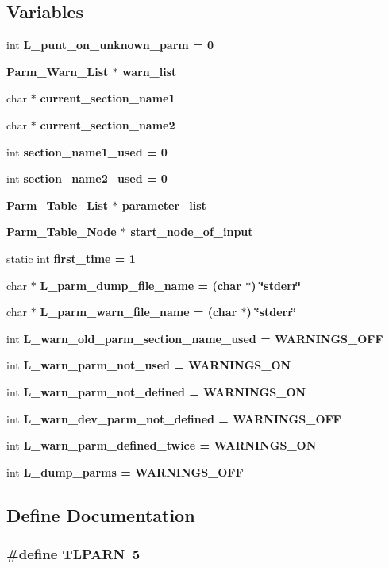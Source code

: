\subsection*{Variables}
\begin{CompactItemize}
\item 
int \bf{L\_\-punt\_\-on\_\-unknown\_\-parm} = 0
\item 
\bf{Parm\_\-Warn\_\-List} $\ast$ \bf{warn\_\-list}
\item 
char $\ast$ \bf{current\_\-section\_\-name1}
\item 
char $\ast$ \bf{current\_\-section\_\-name2}
\item 
int \bf{section\_\-name1\_\-used} = 0
\item 
int \bf{section\_\-name2\_\-used} = 0
\item 
\bf{Parm\_\-Table\_\-List} $\ast$ \bf{parameter\_\-list}
\item 
\bf{Parm\_\-Table\_\-Node} $\ast$ \bf{start\_\-node\_\-of\_\-input}
\item 
static int \bf{first\_\-time} = 1
\item 
char $\ast$ \bf{L\_\-parm\_\-dump\_\-file\_\-name} = (char $\ast$) \char`\"{}stderr\char`\"{}
\item 
char $\ast$ \bf{L\_\-parm\_\-warn\_\-file\_\-name} = (char $\ast$) \char`\"{}stderr\char`\"{}
\item 
int \bf{L\_\-warn\_\-old\_\-parm\_\-section\_\-name\_\-used} = WARNINGS\_\-OFF
\item 
int \bf{L\_\-warn\_\-parm\_\-not\_\-used} = WARNINGS\_\-ON
\item 
int \bf{L\_\-warn\_\-parm\_\-not\_\-defined} = WARNINGS\_\-ON
\item 
int \bf{L\_\-warn\_\-dev\_\-parm\_\-not\_\-defined} = WARNINGS\_\-OFF
\item 
int \bf{L\_\-warn\_\-parm\_\-defined\_\-twice} = WARNINGS\_\-ON
\item 
int \bf{L\_\-dump\_\-parms} = WARNINGS\_\-OFF
\end{CompactItemize}


\subsection{Define Documentation}
\subsubsection{\setlength{\rightskip}{0pt plus 5cm}\#define TLPARN~5}\label{l__parms_8c_c6e8753cb9d6d985c511eabd864875dc}




